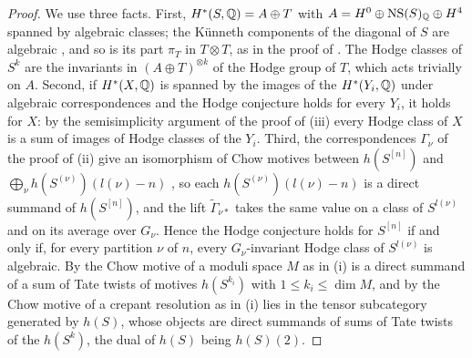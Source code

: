 \begin{proof}
We use three facts. First, $H^{*}(S,\mathbb{Q})=A\oplus T$ with
$A=H^{0}\oplus\mathrm{NS}(S)_{\mathbb{Q}}\oplus H^{4}$ spanned by algebraic classes; the
K\"unneth components of the diagonal of $S$ are algebraic \cite{Mur90}, and
so is its part $\pi_{T}$ in $T\otimes T$, as in the proof of
. The Hodge classes of $S^{k}$ are the invariants in
$(A\oplus T)^{\otimes k}$ of the Hodge group of $T$, which acts trivially on
$A$. Second, if $H^{*}(X,\mathbb{Q})$ is spanned by the images of the
$H^{*}(Y_{i},\mathbb{Q})$ under algebraic correspondences and the Hodge conjecture
holds for every $Y_{i}$, it holds for $X$: by the semisimplicity argument of
the proof of (iii) every Hodge class of $X$ is a sum of
images of Hodge classes of the $Y_{i}$. Third, the correspondences
$\Gamma_{\nu}$ of the proof of (ii) give an isomorphism
of Chow motives between $h(S^{[n]})$ and
$\bigoplus_{\nu}h(S^{(\nu)})(l(\nu)-n)$ \cite{dCM02}, so each
$h(S^{(\nu)})(l(\nu)-n)$ is a direct summand of $h(S^{[n]})$, and the lift
$\widetilde\Gamma_{\nu*}$ takes the same value on a class of $S^{l(\nu)}$ and
on its average over $G_{\nu}$. Hence the Hodge
conjecture holds for $S^{[n]}$ if and only if, for every partition $\nu$ of
$n$, every $G_{\nu}$-invariant Hodge class of $S^{l(\nu)}$ is algebraic. By
\cite[Theorem~0.1, Remark~2.1]{Bue20} the Chow motive of a moduli space $M$
as in (i) is a direct summand of a sum of Tate twists of motives
$h(S^{k_{i}})$ with $1\le k_{i}\le\dim M$, and by
\cite[Corollary~4.5]{FFZ21} the Chow motive of a crepant resolution as in (i)
lies in the tensor subcategory generated by $h(S)$, whose objects are direct
summands of sums of
Tate twists of the $h(S^{k})$, the dual of $h(S)$ being $h(S)(2)$.


\end{proof}
